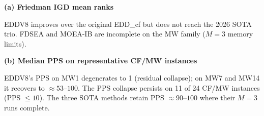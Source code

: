 \begin{table}[t]
\centering
\caption{EDDV8 (grafted, constraint-aware NSGA-2 selection) versus the
original EDD\_cf and three 2026 SOTA algorithms on the official constrained
CF/MW family (CF1--10, MW1--14; 30 seeds per cell). Panel (a) reports
the 5-algorithm Friedman IGD mean ranks. Panel (b) reports the median
final non-dominated-set size (PPS) on a representative subset.
\textbf{EDDV8 ranks 4th of 5 on the CF/MW aggregate ($2.83$), improving
over the original EDD\_cf ($3.75$) but remaining behind the three SOTA
methods.} The PPS collapse that was the original EDD\_cf's defining
weakness is \emph{reduced} but not eliminated: EDDV8's median PPS on
the MW family rises from $\approx 1$ (original EDD\_cf) to
$\approx 24$, but persists at PPS $\le 10$ on eleven of the twenty-four
instances, including six where it degenerates to a single point.}
\label{tab:cfmw}
\vspace{3pt}
\begin{minipage}[t]{0.46\textwidth}
\centering
\footnotesize
\textbf{(a) Friedman IGD mean ranks}


\vspace{4pt}
EDDV8 improves over the original EDD\_cf but does not reach the 2026
SOTA trio. FDSEA and MOEA-IB are incomplete on the MW family
($M=3$ memory limits).
\end{minipage}\hfill
\begin{minipage}[t]{0.46\textwidth}
\centering
\footnotesize
\textbf{(b) Median PPS on representative CF/MW instances}


\vspace{4pt}
EDDV8's PPS on MW1 degenerates to 1 (residual collapse); on MW7 and
MW14 it recovers to $\approx 53$--$100$. The PPS collapse persists on
11 of 24 CF/MW instances (PPS $\le 10$). The three SOTA methods retain
PPS $\approx 90$--$100$ where their $M=3$ runs complete.
\end{minipage}
\end{table}
